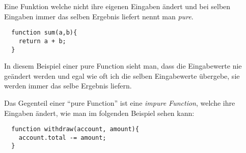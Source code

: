  Eine Funktion welche nicht ihre eigenen Eingaben ändert und bei selben Eingaben immer das selben 
 Ergebnis liefert nennt man \textit{pure}.
\begin{lstlisting}
  function sum(a,b){
    return a + b;
  }
\end{lstlisting}
In diesem Beispiel einer pure Function sieht man, dass die Eingabewerte nie geändert werden und egal 
wie oft ich die selben Eingabewerte übergebe, sie werden immer das selbe Ergebnis liefern.


Das Gegenteil einer ``pure Function'' ist eine \textit{impure Function}, welche ihre Eingaben ändert, 
wie man im folgenden Beispiel sehen kann:
\begin{lstlisting}
  function withdraw(account, amount){
    account.total -= amount;
  }
\end{lstlisting}
~\cite{Props}
\pagebreak